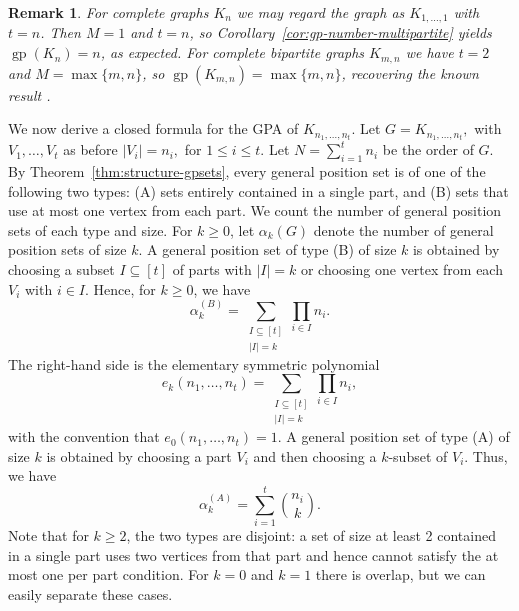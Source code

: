 \documentclass[12pt,twoside]{article}
\newtheorem{remark}[theorem]{Remark}
\begin{document}
	\begin{remark}
		For complete graphs \(K_n\) we may regard the graph as \(K_{1,\dots,1}\) with \(t=n\). Then \(M=1\) and \(t=n\), so Corollary~\ref{cor:gp-number-multipartite} yields \(\operatorname{gp}(K_n)=n\), as expected. For complete bipartite graphs \(K_{m,n}\) we have \(t=2\) and \(M=\max\{m,n\}\), so \(\operatorname{gp}(K_{m,n})=\max\{m,n\}\), recovering the known result \cite{10,20}.
	\end{remark}
	
	
	
	We now derive a closed formula for the GPA of \(K_{n_1,\dots,n_t}\). Let $G = K_{n_1,\dots,n_t},$ with $V_1,\dots,V_t $  as before $|V_i|=n_i,$ for  $1\leq i\leq t$. Let \(N = \sum_{i=1}^t n_i\) be the order of \(G\).  By Theorem~\ref{thm:structure-gpsets}, every general position set is of one of the following two types: (A) sets entirely contained in a single part, and (B) sets that use at most one vertex from each part. We count the number of general position sets of each type and size. For \(k\ge 0\), let \(\alpha_k(G)\) denote the number of general position sets of size \(k\). A general position set of type (B) of size \(k\) is obtained by choosing a subset \(I\subseteq [t]\) of parts with \(|I|=k\) or choosing one vertex from each \(V_i\) with \(i\in I\). Hence, for \(k\ge 0\), we have
	\begin{equation}\label{eq:typeB}
		\alpha_k^{(B)}
		=\sum_{\substack{I\subseteq [t]\\ |I|=k}} \prod_{i\in I} n_i.
	\end{equation}
	The right-hand side is the elementary symmetric polynomial
	\[
	e_k(n_1,\dots,n_t)
	= \sum_{\substack{I\subseteq [t]\\ |I|=k}} \prod_{i\in I} n_i,
	\]
	with the convention that \(e_0(n_1,\dots,n_t)=1\). A general position set of type (A) of size \(k\) is obtained by choosing a part \(V_i\) and then choosing a \(k\)-subset of \(V_i\). Thus, we have
	\begin{equation}\label{eq:typeA}
		\alpha_k^{(A)}
		=\sum_{i=1}^t \binom{n_i}{k}.
	\end{equation}
	Note that for \(k\ge 2\), the two types are disjoint: a set of size at least 2 contained in a single part uses two vertices from that part and hence cannot satisfy the at most one per part condition. For \(k=0\) and \(k=1\) there is overlap, but we can easily separate these cases.
	
\end{document}
